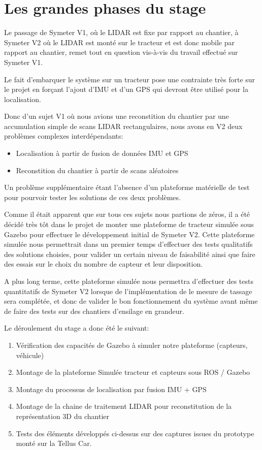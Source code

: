 \documentclass[12pt,a4paper]{report}
\begin{document}
	\section{Les grandes phases du stage}
	
	Le passage de Symeter V1, où le LIDAR est fixe par rapport au chantier, à Symeter V2 où le LIDAR est monté sur le tracteur et est donc mobile par rapport au chantier, remet tout en question vis-à-vis du travail effectué sur Symeter V1.
	
	\para Le fait d'embarquer le système sur un tracteur pose une contrainte très forte sur le projet en forçant l'ajout d'IMU et d'un GPS qui devront être utilisé pour la localisation.
	
	\para Donc d'un sujet V1 où nous avions une reconstition du chantier par une accumulation simple de scans LIDAR rectangulaires, nous avons en V2 deux  problèmes complexes interdépendants:
	\begin{itemize}
		\item Localisation à partir de fusion de données IMU et GPS
		\item Reconstition du chantier à partir de scans aléatoires
	\end{itemize}

	\para Un problème supplémentaire étant l'absence d'un plateforme matérielle de test pour pourvoir tester les solutions de ces deux problèmes.
	
	\para Comme il était apparent que sur tous ces sujets nous partions de zéros, il a été décidé très tôt dans le projet de monter une plateforme de tracteur simulée sous Gazebo pour effectuer le développement initial de Symeter V2. Cette plateforme simulée nous permettrait dans un premier temps d'effectuer des tests qualitatifs des solutions choisies, pour valider un certain niveau de faisabilité ainsi que faire des essais sur le choix du nombre de capteur et leur disposition.
	
	\para A plus long terme, cette plateforme simulée nous permettra d'effectuer des tests quantitatifs de Symeter V2 lorsque de l'implémentation de le mesure de tassage sera complétée, et donc de valider le bon fonctionnement du système avant même de faire des tests sur des chantiers d'ensilage en grandeur.
	
	\para Le déroulement du stage a donc été le suivant:
	\begin{enumerate}
		\item Vérification des capacités de Gazebo à simuler notre plateforme (capteurs, véhicule)
		\item Montage de la plateforme Simulée tracteur et capteurs sous ROS / Gazebo
		\item Montage du processus de localisation par fusion IMU + GPS
		\item Montage de la chaine de traitement LIDAR pour reconstitution de la représentation 3D du chantier
		\item Tests des éléments développés ci-dessus sur des captures issues du prototype monté sur la Tellus Car.
	\end{enumerate}
\end{document}
